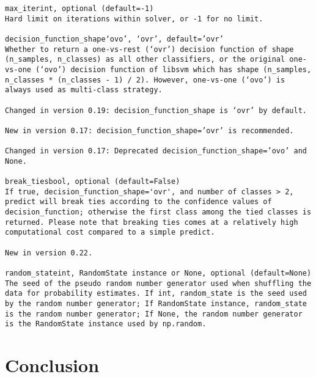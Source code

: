 \documentclass[12pt]{article}
\begin{document}
\begin{verbatim}
max_iterint, optional (default=-1)
Hard limit on iterations within solver, or -1 for no limit.

decision_function_shape‘ovo’, ‘ovr’, default=’ovr’
Whether to return a one-vs-rest (‘ovr’) decision function of shape (n_samples, n_classes) as all other classifiers, or the original one-vs-one (‘ovo’) decision function of libsvm which has shape (n_samples, n_classes * (n_classes - 1) / 2). However, one-vs-one (‘ovo’) is always used as multi-class strategy.

Changed in version 0.19: decision_function_shape is ‘ovr’ by default.

New in version 0.17: decision_function_shape=’ovr’ is recommended.

Changed in version 0.17: Deprecated decision_function_shape=’ovo’ and None.

break_tiesbool, optional (default=False)
If true, decision_function_shape='ovr', and number of classes > 2, predict will break ties according to the confidence values of decision_function; otherwise the first class among the tied classes is returned. Please note that breaking ties comes at a relatively high computational cost compared to a simple predict.

New in version 0.22.

random_stateint, RandomState instance or None, optional (default=None)
The seed of the pseudo random number generator used when shuffling the data for probability estimates. If int, random_state is the seed used by the random number generator; If RandomState instance, random_state is the random number generator; If None, the random number generator is the RandomState instance used by np.random.
\end{verbatim}

\newpage
\section{Conclusion}
\newpage

\end{document}
